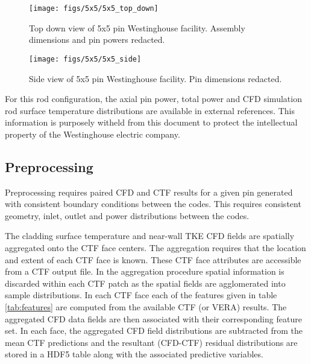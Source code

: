 \begin{figure}[H]
    \centering
    \texttt{[image: figs/5x5/5x5\_top\_down]}
    \caption[Top down view of 5x5 pin Westinghouse facility.]{Top down view of 5x5 pin Westinghouse facility.  Assembly dimensions and pin powers redacted.}
    \label{fig:5x5topdown}
\end{figure}

\begin{figure}[H]
    \centering
    \texttt{[image: figs/5x5/5x5\_side]}
    \caption[Side view of 5x5 pin Westinghouse facility.]{Side view of 5x5 pin Westinghouse facility.  Pin dimensions redacted.}
    \label{fig:5x5side}
\end{figure}

For this rod configuration, the axial pin power, total power and CFD simulation rod surface temperature distributions are available in external references.  This information is purposely witheld from this document to protect the intellectual property of the Westinghouse electric company.


\subsection{Preprocessing}
\label{sec:preprocessing}

Preprocessing requires paired CFD and CTF results for a given pin generated with consistent boundary conditions between the codes.  This requires consistent geometry, inlet, outlet and power distributions between the codes.

The cladding surface temperature and near-wall TKE CFD fields are spatially aggregated onto the CTF face centers.  The aggregation requires that the location and extent of each CTF face is known.  These CTF face attributes are accessible from a CTF output file.  In the aggregation procedure spatial information is discarded within each CTF patch as the spatial fields are agglomerated into sample distributions.
In each CTF face each of the features given in table \ref{tab:features} are computed from the available CTF (or VERA) results.
The aggregated CFD data fields are then associated with their corresponding feature set.
In each face, the aggregated CFD field distributions are subtracted from the mean CTF predictions and the resultant (CFD-CTF) residual distributions are stored in a HDF5 table along with the associated predictive variables.


